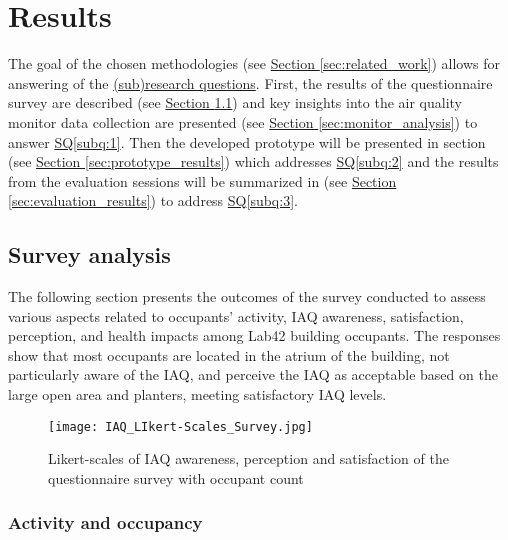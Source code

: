 \section{Results}
\label{sec:results}

The goal of the chosen methodologies (see \hyperref[sec:related_work]{Section \ref*{sec:related_work}}) allows for answering of the \hyperref[rq:1]{(sub)research questions}. First, the results of the questionnaire survey are described (see \hyperref[sec:survey_analysis]{Section \ref*{sec:survey_analysis}}) and key insights into the air quality monitor data collection are presented (see \hyperref[sec:monitor_analysis] {Section \ref*{sec:monitor_analysis}}) to answer \hyperref[subq:1]{SQ\ref*{subq:1}}. Then the developed prototype will be presented in section (see \hyperref[sec:prototype_results]{Section \ref*{sec:prototype_results}}) which addresses \hyperref[subq:2]{SQ\ref*{subq:2}} and the results from the evaluation sessions will be summarized in (see \hyperref[sec:evaluation_results]{Section \ref*{sec:evaluation_results}}) to address \hyperref[subq:3]{SQ\ref*{subq:3}}.

\subsection{Survey analysis}
\label{sec:survey_analysis}

The following section presents the outcomes of the survey conducted to assess various aspects related to occupants' activity, IAQ awareness, satisfaction, perception, and health impacts among Lab42 building occupants. The responses show that most occupants are located in the atrium of the building, not particularly aware of the IAQ, and perceive the IAQ as acceptable based on the large open area and planters, meeting satisfactory IAQ levels.

\begin{figure}[H]
    \centering
    \texttt{[image: IAQ\_LIkert-Scales\_Survey.jpg]}
    \caption{Likert-scales of IAQ awareness, perception and satisfaction of the questionnaire survey with occupant count}
    \label{fig:complexity}
\end{figure}

\subsubsection{Activity and occupancy}

